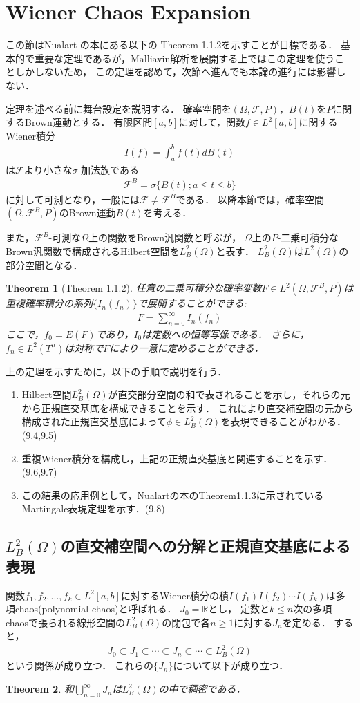 \documentclass[a4paper,10pt]{jsarticle}
\theoremstyle{plain}
\newtheorem{theorem}{Theorem}
\newcommand{\eq}[1]{\begin{align}#1\end{align}}
\newcommand{\enums}[1]{\begin{enumerate}#1\end{enumerate}}
\begin{document}
\section{Wiener Chaos Expansion}
この節はNualart の本にある以下の Theorem 1.1.2を示すことが目標である．
基本的で重要な定理であるが，Malliavin解析を展開する上ではこの定理を使うことしかしないため，
この定理を認めて，次節へ進んでも本論の進行には影響しない．

定理を述べる前に舞台設定を説明する．
確率空間を$(\Omega, \mathcal{F}, P)$，$B(t)$を$P$に関するBrown運動とする．
有限区間$[a, b]$に対して，関数$f\in L^2[a, b]$に関するWiener積分
\eq{I(f)=\int_a^bf(t)dB(t)}
は$\mathcal{F}$より小さな$\sigma$-加法族である
\eq{\mathcal{F}^B=\sigma\{B(t);a\le t\le b\}}
に対して可測となり，一般には$\mathcal{F}\neq\mathcal{F}^B$である．
以降本節では，確率空間$(\Omega, \mathcal{F}^B, P)$のBrown運動$B(t)$を考える．

また，$\mathcal{F}^B$-可測な$\Omega$上の関数をBrown汎関数と呼ぶが，
$\Omega$上の$P$-二乗可積分なBrown汎関数で構成されるHilbert空間を$L^2_B(\Omega)$と表す．
$L^2_B(\Omega)$は$L^2(\Omega)$の部分空間となる．

\begin{theorem}[Theorem 1.1.2]
任意の二乗可積分な確率変数$F\in L^2(\Omega, \mathcal{F}^B, P)$は重複確率積分の系列$\{I_n(f_n)\}$で展開することができる:
\eq{F=\sum_{n=0}^\infty I_n(f_n)}
ここで，$f_0=E(F)$であり，$I_0$は定数への恒等写像である．
さらに，$f_n\in L^2(T^n)$は対称で$F$により一意に定めることができる．
\end{theorem}

上の定理を示すために，以下の手順で説明を行う．
\enums{
	\item Hilbert空間$L^2_B(\Omega)$が直交部分空間の和で表されることを示し，それらの元から正規直交基底を構成できることを示す．
	これにより直交補空間の元から構成された正規直交基底によって$\phi\in L^2_B(\Omega)$を表現できることがわかる．(9.4,9.5)
	\item 重複Wiener積分を構成し，上記の正規直交基底と関連することを示す．(9.6,9.7)
	\item この結果の応用例として，Nualartの本のTheorem1.1.3に示されているMartingale表現定理を示す．(9.8)
}

\subsection{$L^2_B(\Omega)$の直交補空間への分解と正規直交基底による表現}
関数$f_1,f_2,...,f_k\in L^2[a,b]$に対するWiener積分の積$I(f_1)I(f_2)\cdots I(f_k)$は多項chaos(polynomial chaos)と呼ばれる．
$J_0=\mathbb{R}$とし，
定数と$k\le n$次の多項chaosで張られる線形空間の$L^2_B(\Omega)$の閉包で各$n\ge 1$に対する$J_n$を定める．
すると，
\eq{J_0\subset J_1\subset\cdots\subset J_n\subset\cdots\subset L^2_B(\Omega)\label{9.4.5}}
という関係が成り立つ．
これらの$\{J_n\}$について以下が成り立つ．
\begin{theorem}\label{thm9.4.5}%
和$\bigcup_{n=0}^\infty J_n$は$L^2_B(\Omega)$の中で稠密である．
\end{theorem}
\end{document}
